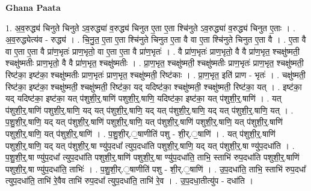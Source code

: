 \documentclass[17pt]{extarticle}
\begin{document}
\textbf{Ghana Paata } \newline

1. अ॒व॒रुद्ध्य॑ चिनुते चिनुते ऽव॒रुद्ध्या॑ व॒रुद्ध्य॑ चिनुत ए॒ता ए॒ता श्चि॑नुते ऽव॒रुद्ध्या॑ व॒रुद्ध्य॑ चिनुत ए॒ताः । . अ॒व॒रुद्ध्येत्य॑व - रुद्ध्य॑ । . चि॒नु॒त॒ ए॒ता ए॒ता श्चि॑नुते चिनुत ए॒ता वै वा ए॒ता श्चि॑नुते चिनुत ए॒ता वै । . ए॒ता वै वा ए॒ता ए॒ता वै प्रा॑ण॒भृतः॑ प्राण॒भृतो॒ वा ए॒ता ए॒ता वै प्रा॑ण॒भृतः॑ । . वै प्रा॑ण॒भृतः॑ प्राण॒भृतो॒ वै वै प्रा॑ण॒भृत॒ श्चक्षु॑ष्मती॒ श्चक्षु॑ष्मतीः प्राण॒भृतो॒ वै वै प्रा॑ण॒भृत॒ श्चक्षु॑ष्मतीः । . प्रा॒ण॒भृत॒ श्चक्षु॑ष्मती॒ श्चक्षु॑ष्मतीः प्राण॒भृतः॑ प्राण॒भृत॒ श्चक्षु॑ष्मती॒ रिष्ट॑का॒ इष्ट॑का॒ श्चक्षु॑ष्मतीः प्राण॒भृतः॑ प्राण॒भृत॒ श्चक्षु॑ष्मती॒ रिष्ट॑काः । . प्रा॒ण॒भृत॒ इति॑ प्राण - भृतः॑ । . चक्षु॑ष्मती॒ रिष्ट॑का॒ इष्ट॑का॒ श्चक्षु॑ष्मती॒ श्चक्षु॑ष्मती॒ रिष्ट॑का॒ यद् यदिष्ट॑का॒ श्चक्षु॑ष्मती॒ श्चक्षु॑ष्मती॒ रिष्ट॑का॒ यत् । . इष्ट॑का॒ यद् यदिष्ट॑का॒ इष्ट॑का॒ यत् प॑शुशी॒र्॒.षाणि॑ पशुशी॒र्॒.षाणि॒ यदिष्ट॑का॒ इष्ट॑का॒ यत् प॑शुशी॒र्॒.षाणि॑ । . यत् प॑शुशी॒र्॒.षाणि॑ पशुशी॒र्॒.षाणि॒ यद् यत् प॑शुशी॒र्॒.षाणि॒ यद् यत् प॑शुशी॒र्॒.षाणि॒ यद् यत् प॑शुशी॒र्॒.षाणि॒ यत् । . प॒शु॒शी॒र्॒.षाणि॒ यद् यत् प॑शुशी॒र्॒.षाणि॑ पशुशी॒र्॒.षाणि॒ यत् प॑शुशी॒र्॒.षाणि॑ पशुशी॒र्॒.षाणि॒ यत् प॑शुशी॒र्॒.षाणि॑ पशुशी॒र्॒.षाणि॒ यत् प॑शुशी॒र्॒.षाणि॑ । . प॒शु॒शी॒र्.॒षाणीति॑ पशु - शी॒र्.॒षाणि॑ । . यत् प॑शुशी॒र्॒.षाणि॑ पशुशी॒र्॒.षाणि॒ यद् यत् प॑शुशी॒र्॒.षा ण्यु॑प॒दधा᳚ त्युप॒दधा॑ति पशुशी॒र्॒.षाणि॒ यद् यत् प॑शुशी॒र्॒.षा ण्यु॑प॒दधा॑ति । . प॒शु॒शी॒र्॒.षा ण्यु॑प॒दधा᳚ त्युप॒दधा॑ति पशुशी॒र्॒.षाणि॑ पशुशी॒र्॒.षा ण्यु॑प॒दधा॑ति॒ ताभि॒ स्ताभि॑ रुप॒दधा॑ति पशुशी॒र्॒.षाणि॑ पशुशी॒र्॒.षा ण्यु॑प॒दधा॑ति॒ ताभिः॑ । . प॒शु॒शी॒र्.॒षाणीति॑ पशु - शी॒र्.॒षाणि॑ । . उ॒प॒दधा॑ति॒ ताभि॒ स्ताभि॑ रुप॒दधा᳚ त्युप॒दधा॑ति॒ ताभि॑ रे॒वैव ताभि॑ रुप॒दधा᳚ त्युप॒दधा॑ति॒ ताभि॑ रे॒व । . उ॒प॒दधा॒तीत्यु॑प - दधा॑ति । \newline
\end{document}
